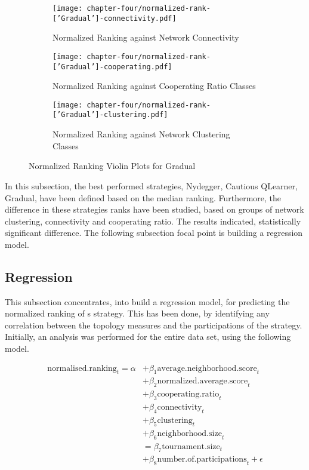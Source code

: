 \begin{figure}[!hbtp]
	\centering
	\begin{subfigure}[t]{0.70\textwidth}
		\centering
		\texttt{[image: chapter-four/normalized-rank-['Gradual']-connectivity.pdf]}
		\caption{Normalized Ranking against Network Connectivity}
	\end{subfigure}
	\hfill
	\begin{subfigure}[t]{0.70\textwidth}\centering
		\centering
		\texttt{[image: chapter-four/normalized-rank-['Gradual']-cooperating.pdf]}
		\caption{Normalized Ranking against Cooperating Ratio Classes}
	\end{subfigure}
	\hfill
	\begin{subfigure}[t]{0.70\textwidth}\centering
		\centering
		\texttt{[image: chapter-four/normalized-rank-['Gradual']-clustering.pdf]}
		\caption{Normalized Ranking against Network Clustering Classes}
	\end{subfigure}
	\caption{Normalized Ranking Violin Plots for Gradual}
	\label{gradual}
\end{figure}

In this subsection, the best performed strategies, Nydegger, Cautious QLearner, Gradual,
have been defined based on the median ranking. Furthermore, the difference in
these strategies ranks have been studied, based on groups of network clustering,
connectivity and cooperating ratio.
The results indicated, statistically significant
difference. The following subsection focal point is building a regression model.

\subsection{Regression}

This subsection concentrates, into build a regression model, for predicting
the normalized ranking of s strategy. This has been done, by identifying any
correlation between the topology measures and the participations of the strategy.
Initially, an analysis was performed for the entire data set, using the following
model.

\begin{align}
	\mathrm{normalised.ranking}_{t} = \alpha
	  & + \beta_{1}  \mathrm{average.neighborhood.score}_{t}          \\
	  & + \beta_{2}  \mathrm{normalized.average.score}_{t}            \\
	  & + \beta_{3}  \mathrm{cooperating.ratio}_{t}                   \\
	  & + \beta_{4}  \mathrm{connectivity}_{t}                        \\
	  & + \beta_{5}  \mathrm{clustering}_{t}                          \\
	  & + \beta_{6}  \mathrm{neighborhood.size}_{t}                   \\
	  & = \beta_{7}  \mathrm{tournament.size}_{t}                     \\
	  & + \beta_{8}  \mathrm{number.of.participations}_{t} + \epsilon
\end{align}

